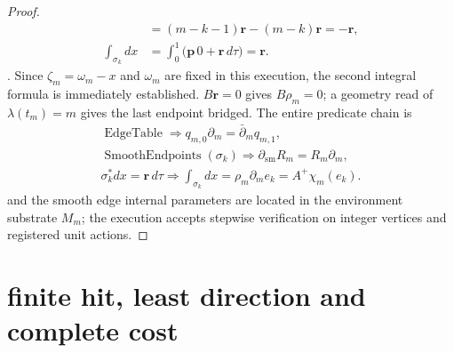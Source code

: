 \documentclass[12pt,a4paper,openany,notitlepage]{report}
\theoremstyle{plain}
\theoremstyle{definition}
\theoremstyle{remark}
\def\mathcal#1{#1}\def\mathsf#1{#1}\def\mathbb#1{#1}%
\begin{document}
\begin{CJK*}
\begin{proof}
\[\begin{aligned}
 &=(m-k-1)\mathbf r-(m-k)\mathbf r
 =-\mathbf r,\\
 \int_{\sigma_k}dx
 &=\int_0^1\bigl(\mathbf p\,0+\mathbf r\,d\tau\bigr)
 =\mathbf r.
 \end{aligned}
\]. Since $\zeta_m=\omega_m-x$ and $\omega_m$ are fixed in this execution, the second integral formula is immediately established. $B\mathbf r=0$ gives $B\rho_m=0$; a geometry read of $\lambda(t_m)=m$ gives the last endpoint bridged. The entire predicate chain is \[
 \begin{gathered}
 \operatorname{EdgeTable}
 \Longrightarrow q_{m,0}\partial_m=\bar\partial_mq_{m,1},\\
 \operatorname{SmoothEndpoints}(\sigma_k)
 \Longrightarrow
 \partial_{\mathrm{sm}}\mathcal R_m=\mathcal R_m\partial_m,\\
 \sigma_k^*dx=\mathbf r\,d\tau
 \Longrightarrow
 \int_{\sigma_k}dx=\rho_m\partial_me_k=A^+\chi_m(e_k).
 \end{gathered}
\] and the smooth edge internal parameters are located in the environment substrate $M_m$; the execution accepts stepwise verification on integer vertices and registered unit actions.\end{proof}


\section { finite hit, least direction and complete cost }


\end{CJK*}
\end{document}
